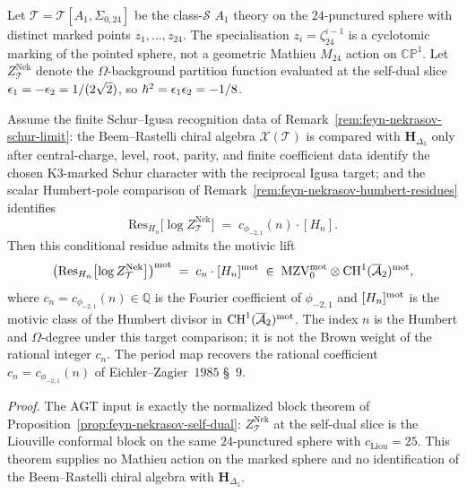 \begin{proposition}
\label{prop:mst-nekrasov-humbert-motivic}
Let $\mathcal T = \mathcal T[A_1, \Sigma_{0,24}]$
be the class-$\mathcal S$ $A_1$ theory on the $24$-punctured sphere
with distinct marked points $z_1,\ldots,z_{24}$. The specialisation
$z_i=\zeta_{24}^{i-1}$ is a cyclotomic marking of the pointed sphere,
not a geometric Mathieu $M_{24}$ action on $\mathbb{CP}^1$. Let
$Z^{\mathrm{Nek}}_{\mathcal T}$ denote the $\Omega$-background
partition function evaluated at the self-dual slice
$\epsilon_1 = -\epsilon_2 = 1/(2\sqrt 2)$, so
$\hbar^2 = \epsilon_1\epsilon_2 = -1/8$.

Assume the finite Schur--Igusa recognition data of
Remark~\ref{rem:feyn-nekrasov-schur-limit}: the Beem--Rastelli
chiral algebra $\mathcal X(\mathcal T)$ is compared with
$\mathbf H_{\Delta_5}$ only after central-charge, level, root, parity,
and finite coefficient data identify the chosen K3-marked Schur
character with the reciprocal Igusa target; and the scalar Humbert-pole
comparison of Remark~\ref{rem:feyn-nekrasov-humbert-residues}
identifies
\[
 \mathrm{Res}_{H_n}\bigl[\log Z^{\mathrm{Nek}}_{\mathcal T}\bigr]
 \;=\; c_{\phi_{-2,1}}(n)\cdot [H_n].
\]
Then this conditional residue admits the motivic lift
\[
 \bigl(\mathrm{Res}_{H_n}\bigl[\log Z^{\mathrm{Nek}}_{\mathcal T}\bigr]\bigr)^{\mathrm{mot}}
 \;=\; c_n\cdot [H_n]^{\mathrm{mot}}
 \;\in\; \mathrm{MZV}^{\mathrm{mot}}_{0}
 \otimes \mathrm{CH}^1(\overline{\mathcal A}_2)^{\mathrm{mot}},
\]
where $c_n=c_{\phi_{-2,1}}(n)\in\mathbb Q$ is the Fourier coefficient
of $\phi_{-2,1}$ and $[H_n]^{\mathrm{mot}}$ is the motivic class of the Humbert
divisor in
$\mathrm{CH}^1(\overline{\mathcal A}_2)^{\mathrm{mot}}$. The index $n$ is the
Humbert and $\Omega$-degree under this target comparison; it is not the
Brown weight of the rational integer $c_n$. The period map recovers the
rational coefficient
$c_n = c_{\phi_{-2,1}}(n)$ of
Eichler--Zagier~$1985$ \S~$9$.

\emph{Proof.} The AGT input is exactly the normalized block theorem of
Proposition~\ref{prop:feyn-nekrasov-self-dual}:
$Z^{\mathrm{Nek}}_{\mathcal T}$ at the self-dual slice is the
Liouville conformal block on the same $24$-punctured sphere with
$c_{\mathrm{Liou}}=25$. This theorem supplies no Mathieu action on the
marked sphere and no identification of the Beem--Rastelli chiral
algebra with $\mathbf H_{\Delta_5}$.


\end{proposition}
